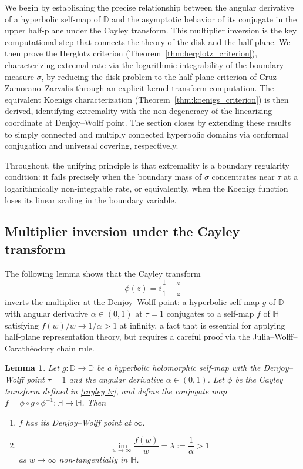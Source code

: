 \documentclass[12pt]{amsart}
\numberwithin{equation}{section}
\theoremstyle{plain}
\newtheorem{lemma}[equation]{Lemma}
\theoremstyle{definition}
\begin{document}
We begin by establishing the precise relationship between
the angular derivative of a hyperbolic self-map of
$\mathbb{D}$ and the asymptotic behavior of its conjugate in the upper half-plane under the Cayley transform.
This multiplier inversion is the key computational step that connects the theory of the disk and the half-plane. We then prove the Herglotz criterion
(Theorem~\ref{thm:herglotz_criterion}), characterizing
extremal rate via the logarithmic integrability of the
boundary measure $\sigma$, by reducing the disk problem
to the half-plane criterion of Cruz-Zamorano--Zarvalis
\cite{cruz} through an explicit kernel transform computation.
The equivalent Koenigs characterization
(Theorem~\ref{thm:koenigs_criterion}) is then derived,
identifying extremality with the non-degeneracy of the
linearizing coordinate at Denjoy--Wolff point.
The section closes by extending these results to simply
connected and multiply connected hyperbolic domains via
conformal conjugation and universal covering, respectively.


Throughout, the unifying principle is that extremality is
a boundary regularity condition: it fails precisely when
the boundary mass of $\sigma$ concentrates near $\tau$
at a logarithmically non-integrable rate, or equivalently,
when the Koenigs function loses its linear scaling in the
boundary variable.

\subsection{Multiplier inversion under the Cayley transform}
\label{subsec:cayley}

The following lemma shows that the Cayley transform
\begin{equation}\label{cayley tr}
\phi(z)=i\frac{1+z}{1-z}
\end{equation}
inverts the multiplier at the Denjoy--Wolff point: a hyperbolic self-map
$g$ of $\mathbb{D}$ with angular derivative $\alpha\in(0,1)$ at $\tau=1$
conjugates to a self-map $f$ of $\mathbb{H}$ satisfying
$f(w)/w\to 1/\alpha>1$ at infinity, a fact that is essential for applying
half-plane representation theory, but requires a careful proof via the
Julia--Wolff--Carath\'eodory chain rule.

\begin{lemma}
\label{lem:multiplier_inversion}
Let $g:\mathbb{D}\to\mathbb{D}$ be a hyperbolic holomorphic self-map with
the Denjoy--Wolff point $\tau=1$ and the angular derivative
$\alpha\in(0,1)$. Let $\phi$ be the Cayley transform defined in \eqref{cayley tr}, and define the conjugate map
$f=\phi\circ g\circ\phi^{-1}:\mathbb{H}\to\mathbb{H}$.
Then
\begin{enumerate}
\item[\emph{(i)}] $f$ has its Denjoy--Wolff point at $\infty$.
\item[\emph{(ii)}]
\begin{equation*}
\lim_{w\to\infty}\frac{f(w)}{w}
=
\lambda:=\frac1\alpha>1
\end{equation*}
as $w\to\infty$ non-tangentially in $\mathbb{H}$.
\end{enumerate}
\end{lemma}
\end{document}
